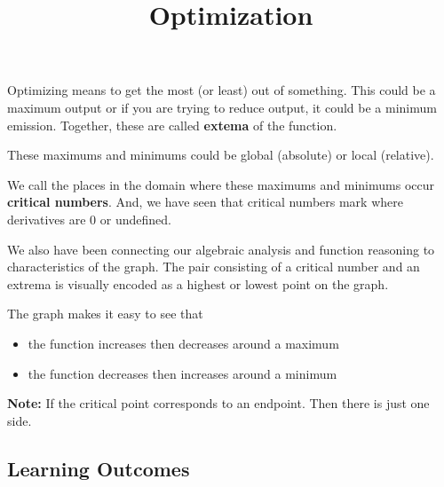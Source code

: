 \documentclass{ximera}
\title{Optimization}
\begin{document}
\begin{abstract}
\end{abstract}
\maketitle








Optimizing means to get the most (or least) out of something.  This could be a maximum output or if you are trying to reduce output, it could be a minimum emission. Together, these are called \textbf{extema} of the function.

These maximums and minimums could be global (absolute) or local (relative).


We call the places in the domain where these maximums and minimums occur \textbf{critical numbers}.  And, we have seen that critical numbers mark where derivatives are $0$ or undefined.


We also have been connecting our algebraic analysis and function reasoning to characteristics of the graph.  The pair consisting of a critical number and an extrema is visually encoded as a highest or lowest point on the graph.

The graph makes it easy to see that 

\begin{itemize}
\item the function increases then decreases around a maximum
\item the function decreases then increases around a minimum
\end{itemize}

\textbf{Note:} If the critical point corresponds to an endpoint.  Then there is just one side.


















\subsection{Learning Outcomes}
\end{document}
